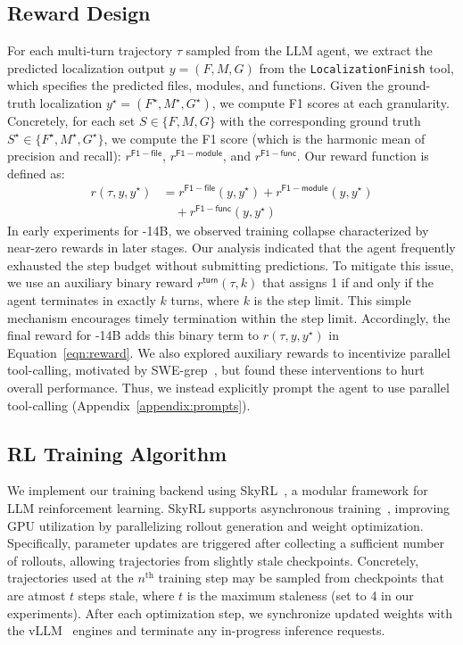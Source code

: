 \subsection{Reward Design}\label{sec:reward_design}
For each multi-turn trajectory $\tau$ sampled from the LLM agent, we extract the predicted localization output $y = (F, M, G)$ from the \texttt{LocalizationFinish} tool, which specifies the predicted files, modules, and functions. Given the ground-truth localization $y^{\star} = (F^{\star}, M^{\star}, G^{\star})$, we compute F1 scores at each granularity. Concretely, for each set $S \in \{F, M, G\}$ with the corresponding ground truth $S^{\star} \in \{F^{\star}, M^{\star}, G^{\star}\}$, we compute the F1 score (which is the harmonic mean of precision and recall): $r^{\mathsf{F1-file}}$, $r^{\mathsf{F1-module}}$, and $r^{\mathsf{F1-func}}$. Our reward function is defined as:
\begin{equation}
\begin{aligned}
    r(\tau, y, y^{\star}) &= r^{\mathsf{F1-file}}(y, y^{\star}) + r^{\mathsf{F1-module}}(y, y^{\star}) \\
    &\quad + r^{\mathsf{F1-func}}(y, y^{\star})
\end{aligned}
\label{eqn:reward}
\end{equation}
In early experiments for \methodname-14B, we observed training collapse characterized by near-zero rewards in later stages. Our analysis indicated that the agent frequently exhausted the step budget without submitting predictions. To mitigate this issue, we use an auxiliary binary reward $r^{\mathsf{turn}}(\tau, k)$ that assigns 1 if and only if the agent terminates in exactly $k$ turns, where $k$ is the step limit. This simple mechanism encourages timely termination within the step limit. Accordingly, the final reward for \methodname-14B adds this binary term to $r(\tau, y, y^{\star})$ in Equation~\ref{eqn:reward}. We also explored auxiliary rewards to incentivize parallel tool-calling, motivated by SWE-grep~\citep{cognition2025swegrep}, but found these interventions to hurt overall performance. Thus, we instead explicitly prompt the agent to use parallel tool-calling (Appendix~\ref{appendix:prompts}).

\subsection{RL Training Algorithm}\label{sec:train_algo}

We implement our training backend using SkyRL~\cite{griggs2025skrylv01}, a modular framework for LLM reinforcement learning. SkyRL supports asynchronous training~\citep{fu2025areallargescaleasynchronousreinforcement}, improving GPU utilization by parallelizing rollout generation and weight optimization. Specifically, parameter updates are triggered after collecting a sufficient number of rollouts, allowing trajectories from slightly stale checkpoints. Concretely, trajectories used at the $n^{\text{th}}$ training step may be sampled from checkpoints that are atmost $t$ steps stale, where $t$ is the maximum staleness (set to 4 in our experiments). After each optimization step, we synchronize updated weights with the vLLM~\citep{kwon2023efficient} engines and terminate any in-progress inference requests.

